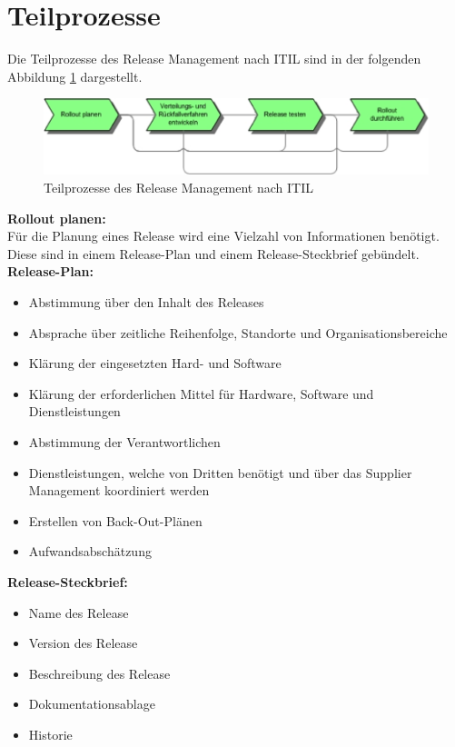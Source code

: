 \section{Teilprozesse}
Die Teilprozesse des Release Management nach ITIL sind in der folgenden Abbildung \ref{fig:tp} dargestellt. 
\begin{figure}[H]
	\includegraphics[width=\textwidth]{img/Teilprozesse.png}
	\caption{Teilprozesse des Release Management nach ITIL \cite{wiki-it}}
	\label{fig:tp}
\end{figure}
\textbf{Rollout planen:}
\\
Für die Planung eines Release wird eine Vielzahl von Informationen benötigt. Diese sind in einem Release-Plan und einem Release-Steckbrief gebündelt. \cite{rm-schiefer-erik}
\\
\textbf{Release-Plan:}
\begin{itemize}
	\item Abstimmung über den Inhalt des Releases
	\item Absprache über zeitliche Reihenfolge, Standorte und Organisationsbereiche
	\item Klärung der eingesetzten Hard- und Software
	\item Klärung der erforderlichen Mittel für Hardware, Software und Dienstleistungen
	\item Abstimmung der Verantwortlichen
	\item Dienstleistungen, welche von Dritten benötigt und über das Supplier Management koordiniert werden
	\item Erstellen von Back-Out-Plänen
	\item Aufwandsabschätzung
\end{itemize}
\textbf{Release-Steckbrief:}
\begin{itemize}
	\item Name des Release
	\item Version des Release
	\item Beschreibung des Release
	\item Dokumentationsablage
	\item Historie
\end{itemize}


